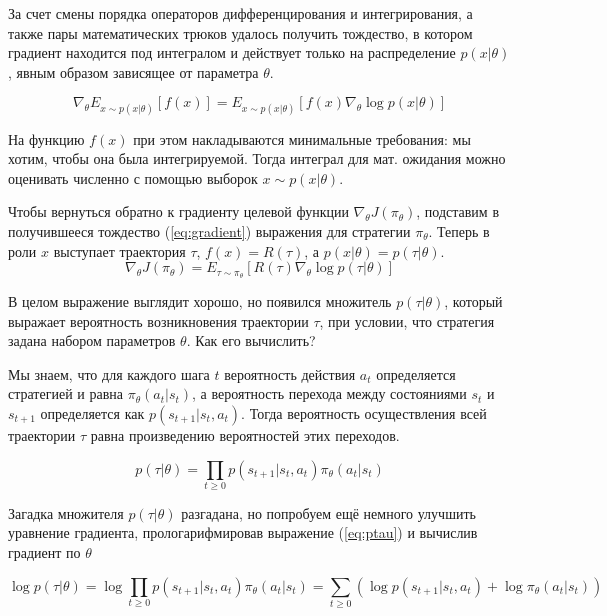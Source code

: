 \documentclass[a4paper,12pt]{article}
\numberwithin{equation}{section}
\begin{document}
За счет смены порядка операторов дифференцирования и интегрирования, а также пары математических трюков удалось получить тождество, в котором градиент находится под интегралом и действует только на распределение $p(x | \theta)$, явным образом зависящее от параметра $\theta$. 

\begin{equation} \label{eq:gradient}
	\nabla_\theta E_{x \sim p(x|\theta)} \left[ f(x)\right] = E_{x \sim p(x|\theta)} \left[ f(x) \nabla_\theta \log p(x | \theta) \right]
\end{equation}

На функцию $f(x)$ при этом накладываются минимальные требования: мы хотим, чтобы она была интегрируемой. Тогда интеграл для мат. ожидания можно оценивать численно с помощью выборок $x \sim p(x | \theta)$. 

Чтобы вернуться обратно к градиенту целевой функции $\nabla_\theta J(\pi_{\theta})$, подставим в получившееся тождество (\ref{eq:gradient}) выражения для стратегии $\pi_{\theta}$. Теперь в роли $x$ выступает траектория $\tau$, $f(x) = R(\tau)$, а $p(x | \theta) = p(\tau | \theta)$.
\begin{equation}
		\nabla_\theta J(\pi_{\theta}) = E_{\tau \sim \pi_{\theta}} \left[ R(\tau) \nabla_\theta \log p(\tau | \theta) \right]
\end{equation}

В целом выражение выглядит хорошо, но появился множитель $p(\tau | \theta)$, который выражает вероятность возникновения траектории $\tau$, при условии, что стратегия задана набором параметров $\theta$. Как его вычислить? 

Мы знаем, что для каждого шага $t$ вероятность действия $a_t$ определяется стратегией и равна $\pi_{\theta} (a_t | s_t)$, а вероятность перехода между состояниями $s_t$ и $s_{t+1}$ определяется как $p(s_{t+1} | s_t, a_t)$. Тогда вероятность осуществления всей траектории $\tau$ равна произведению вероятностей этих переходов.

\begin{equation} \label{eq:ptau}
	p(\tau | \theta) = \prod_{t \ge 0} p(s_{t+1} | s_t, a_t) \pi_\theta(a_t | s_t)
\end{equation}


Загадка множителя $p(\tau | \theta)$ разгадана, но попробуем ещё немного улучшить уравнение градиента, прологарифмировав выражение (\ref{eq:ptau}) и вычислив градиент по $\theta$

\begin{equation*}
	\log p(\tau | \theta) = \log \prod_{t \ge 0} p(s_{t+1} | s_t, a_t) \pi_\theta(a_t | s_t)  = 
						   \sum_{t \ge 0} \left( \log p(s_{t+1} | s_t, a_t) + \log \pi_\theta(a_t | s_t) \right) 
\end{equation*}
\end{document}
